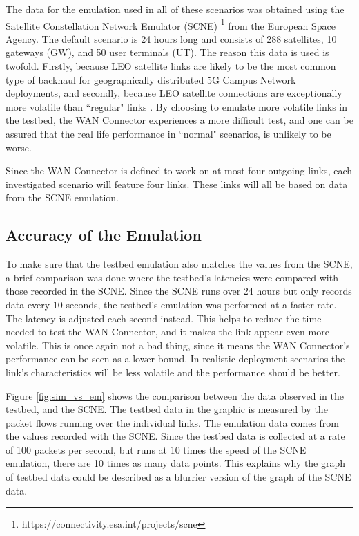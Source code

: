 The data for the emulation used in all of these scenarios was obtained using the Satellite Constellation Network Emulator (SCNE) \footnote{https://connectivity.esa.int/projects/scne} from the European Space Agency. The default scenario is 24 hours long and consists of 288 satellites, 10 gateways (GW), and 50 user terminals (UT). The reason this data is used is twofold. Firstly, because LEO satellite links are likely to be the most common type of backhaul for geographically distributed 5G Campus Network deployments, and secondly, because LEO satellite connections are exceptionally more volatile than “regular" links \cite{deutschmann2022broadband} \cite{ma2023network}. By choosing to emulate more volatile links in the testbed, the WAN Connector experiences a more difficult test, and one can be assured that the real life performance in “normal" scenarios, is unlikely to be worse.

Since the WAN Connector is defined to work on at most four outgoing links, each investigated scenario will feature four links. These links will all be based on data from the SCNE emulation.

\subsection{Accuracy of the Emulation}

To make sure that the testbed emulation also matches the values from the SCNE, a brief comparison was done where the testbed's latencies were compared with those recorded in the SCNE. Since the SCNE runs over 24 hours but only records data every 10 seconds, the testbed's emulation was performed at a faster rate. The latency is adjusted each second instead. This helps to reduce the time needed to test the WAN Connector, and it makes the link appear even more volatile. This is once again not a bad thing, since it means the WAN Connector's performance can be seen as a lower bound. In realistic deployment scenarios the link's characteristics will be less volatile and the performance should be better.

Figure \ref{fig:sim_vs_em} shows the comparison between the data observed in the testbed, and the SCNE. The testbed data in the graphic is measured by the packet flows running over the individual links. The emulation data comes from the values recorded with the SCNE. Since the testbed data is collected at a rate of 100 packets per second, but runs at 10 times the speed of the SCNE emulation, there are 10 times as many data points. This explains why the graph of testbed data could be described as a blurrier version of the graph of the SCNE data.

